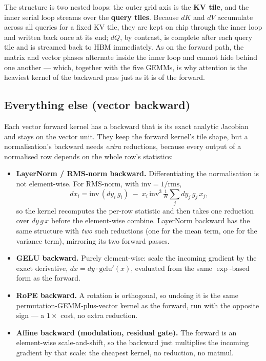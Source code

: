 \documentclass[11pt]{report}
\begin{document}
\noindent The structure is two nested loops: the outer grid axis is the
\textbf{KV tile}, and the inner serial loop streams over the \textbf{query
tiles}. Because $dK$ and $dV$ accumulate across all queries for a fixed KV
tile, they are kept on chip through the inner loop and written back once at
its end; $dQ$, by contrast, is complete after each query tile and is streamed
back to HBM immediately. As on the forward path, the matrix and vector phases
alternate inside the inner loop and cannot hide behind one another --- which,
together with the five GEMMs, is why attention is the heaviest kernel of the
backward pass just as it is of the forward.

\subsection{Everything else (vector backward)}

Each vector forward kernel has a backward that is its exact analytic
Jacobian and stays on the vector unit. They keep the forward kernel's tile
shape, but a normalisation's backward needs \emph{extra} reductions, because
every output of a normalised row depends on the whole row's statistics:

\begin{itemize}
\item \textbf{LayerNorm / RMS-norm backward.} Differentiating the
normalisation is not element-wise. For RMS-norm, with
$\mathrm{inv}=1/\mathrm{rms}$,
\[
dx_i = \mathrm{inv}\,(dy_i\,g_i) \;-\; x_i\,\mathrm{inv}^3\,\tfrac1H\textstyle\sum_j dy_j\,g_j\,x_j,
\]
so the kernel recomputes the per-row statistic and then takes one reduction
over $dy\,g\,x$ before the element-wise combine. LayerNorm backward has the
same structure with \emph{two} such reductions (one for the mean term, one
for the variance term), mirroring its two forward passes.
\item \textbf{GELU backward.} Purely element-wise: scale the incoming
gradient by the exact derivative, $dx = dy\cdot\mathrm{gelu}'(x)$, evaluated
from the same $\exp$-based form as the forward.
\item \textbf{RoPE backward.} A rotation is orthogonal, so undoing it is the
same permutation-GEMM-plus-vector kernel as the forward, run with the
opposite sign --- a $1\times$ cost, no extra reduction.
\item \textbf{Affine backward (modulation, residual gate).} The forward is an
element-wise scale-and-shift, so the backward just multiplies the incoming
gradient by that scale: the cheapest kernel, no reduction, no matmul.
\end{itemize}
\end{document}

